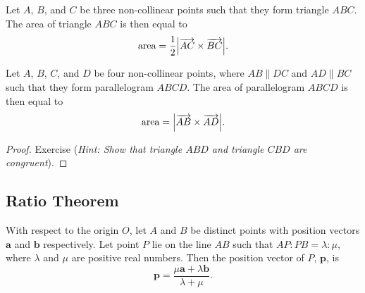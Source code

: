\documentclass[12pt]{article}
\renewcommand{\vec}{\mathbf}
\begin{document}
\begin{thm}
	Let \(A\), \(B\), and \(C\) be three non-collinear points such that they form triangle \(ABC\).
	The area of triangle \(ABC\) is then equal to
	\[ \text{area} = \frac{1}{2} \abs*{\overrightarrow{AC} \times \overrightarrow{BC}}. \] 
\end{thm}

\begin{thm}
	Let \(A\), \(B\), \(C\), and \(D\) be four non-collinear points, where \(AB \parallel DC\) and \(AD \parallel BC\) such that they form parallelogram \(ABCD\).
	The area of parallelogram \(ABCD\) is then equal to
	\[ \text{area} = \abs*{\overrightarrow{AB} \times \overrightarrow{AD}}. \] 
	\begin{figure}[H]
		\centering
	\end{figure}
\end{thm}

\begin{proof}
	Exercise (\textit{Hint: Show that triangle \(ABD\) and triangle \(CBD\) are congruent}).
\end{proof}

\subsection{Ratio Theorem}
\begin{thm}
	With respect to the origin \(O\), let \(A\) and \(B\) be distinct points with position vectors \(\vec{a}\) and \(\vec{b}\) respectively.
	Let point \(P\) lie on the line \(AB\) such that \(AP : PB = \lambda : \mu\), where \(\lambda\) and \(\mu\) are positive real numbers.
	Then the position vector of \(P\), \(\vec{p}\), is 
	\[ \vec{p} = \frac{\mu \vec{a} + \lambda \vec{b}}{\lambda + \mu}. \] 
\end{thm}

\begin{figure}[H]
	\centering
\end{figure}
\end{document}

